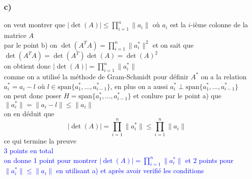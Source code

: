 \documentclass[11pt, a4paper, oneside]{article}
\begin{document}
\subsubsection*{c)}
on veut montrer que $|\det(A)| \leq \prod_{i=1}^n \lVert a_i \rVert$ {\tiny où $a_i$ est la $i$-ième colonne de la matrice $A$} \\
{\tiny par le point b) on $\det(A^TA) = \prod_{i=1}^n \lVert a_i^* \rVert^2$} et on sait que $\det(A^TA) = \det(A^T)\det(A) = \det(A)^2$ \\
on obtient donc $|\det(A)| = \prod_{i=1}^n \lVert a_i^* \rVert$ \\
comme on a utilisé la méthode de Gram-Schmidt pour définir $A^*$ on a la relation $a_i^* = a_i -l$ où $l \in \text{span}\{a_1^*,\ldots,a_{i-1}^*\}$, en plus on a aussi $a_i^* \perp \text{span}\{a_1^*,\ldots,a_{i-1}^*\}$ \\
on peut donc poser $H = \text{span}\{a_1^*,\ldots,a_{i-1}^*\}$ et conlure par le point a) que $\lVert a_i^* \rVert = \lVert a_i-l \rVert \leq \lVert a_i \rVert$ \\
on en déduit que $$|\det(A)| = \prod_{i=1}^n \lVert a_i^* \rVert \leq \prod_{i=1}^n \lVert a_i \rVert$$
{\tiny ce qui termine la preuve} \\
\textcolor{blue}{3 points en total \\ on donne 1 point pour montrer $|\det(A)| = \prod_{i=1}^n \lVert a_i^* \rVert$ et 2 points pour $\lVert a_i^* \rVert \leq \lVert a_i \rVert$ en utilisant a) et après avoir verifié les conditions}
\end{document}
